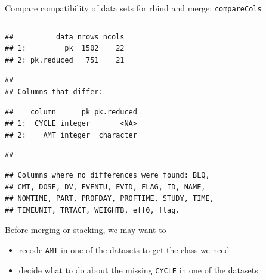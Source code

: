 \documentclass[
  8pt,
  ignorenonframetext,
  aspectratio=169]{beamer}
\providecommand{\tightlist}{%
  \setlength{\itemsep}{0pt}\setlength{\parskip}{0pt}}
\begin{document}
\begin{frame}[fragile]{Compare compatibility of data sets for rbind and
merge: \texttt{compareCols}}
\begin{columns}[T]
\begin{column}{0.48\textwidth}
\begin{verbatim}
##          data nrows ncols
## 1:         pk  1502    22
## 2: pk.reduced   751    21
\end{verbatim}

\begin{verbatim}
## 
## Columns that differ:
\end{verbatim}

\begin{verbatim}
##    column      pk pk.reduced
## 1:  CYCLE integer       <NA>
## 2:    AMT integer  character
\end{verbatim}

\begin{verbatim}
## 
\end{verbatim}

\begin{verbatim}
## Columns where no differences were found: BLQ,
## CMT, DOSE, DV, EVENTU, EVID, FLAG, ID, NAME,
## NOMTIME, PART, PROFDAY, PROFTIME, STUDY, TIME,
## TIMEUNIT, TRTACT, WEIGHTB, eff0, flag.
\end{verbatim}

\vspace{12pt}

Before merging or stacking, we may want to

\begin{itemize}
\tightlist
\item
  recode \texttt{AMT} in one of the datasets to get the class we need
\item
  decide what to do about the missing \texttt{CYCLE} in one of the
  datasets
\end{itemize}
\end{column}
\end{columns}
\end{frame}
\end{document}
